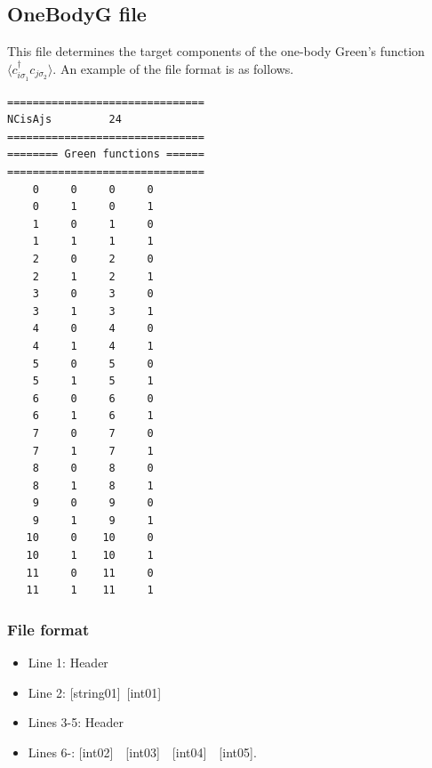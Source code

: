 \subsection{OneBodyG file}
\label{Subsec:onebodyg}
This file determines the target components of the one-body Green's function $\langle c_{i\sigma_1}^{\dagger}c_{j\sigma_2}\rangle$. An example of the file format is as follows.

\begin{minipage}{12.5cm}
\begin{screen}
\begin{verbatim}
===============================
NCisAjs         24
===============================
======== Green functions ======
===============================
    0     0     0     0
    0     1     0     1
    1     0     1     0
    1     1     1     1
    2     0     2     0
    2     1     2     1
    3     0     3     0
    3     1     3     1
    4     0     4     0
    4     1     4     1
    5     0     5     0
    5     1     5     1
    6     0     6     0
    6     1     6     1
    7     0     7     0
    7     1     7     1
    8     0     8     0
    8     1     8     1
    9     0     9     0
    9     1     9     1
   10     0    10     0
   10     1    10     1
   11     0    11     0
   11     1    11     1
\end{verbatim}
\end{screen}
\end{minipage}

\subsubsection{File format}
 \begin{itemize}
   \item  Line 1:  Header
   \item  Line 2:   [string01]~[int01]
   \item  Lines 3-5:  Header
   \item  Lines 6-: 
  [int02]~~[int03]~~[int04]~~[int05].
  \end{itemize}

